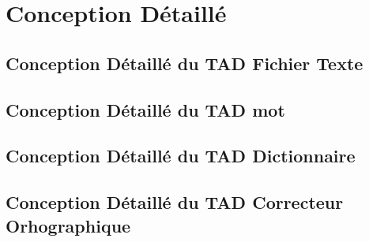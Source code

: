 \section{Conception Détaillé}
	\subsection{Conception Détaillé du TAD Fichier Texte}
		
		
	\subsection{Conception Détaillé du TAD mot}
		
		
	\subsection{Conception Détaillé du TAD Dictionnaire}
		
		
	\subsection{Conception Détaillé du TAD Correcteur Orhographique}
		
		
